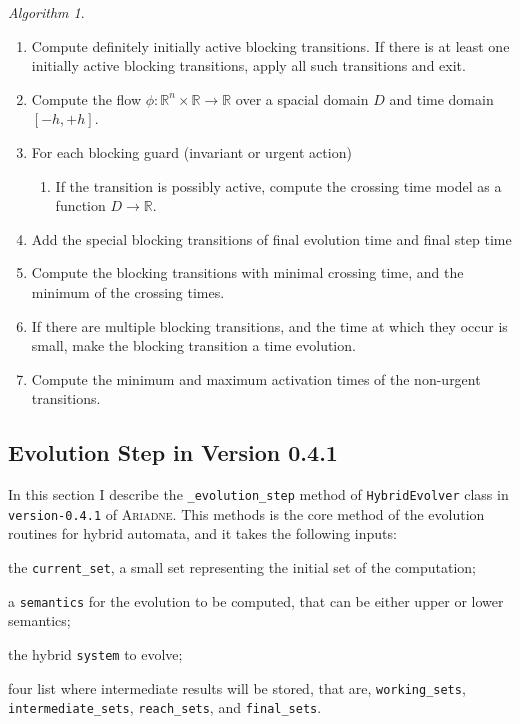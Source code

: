 \documentclass[english,a4paper]{article}
\newcommand{\R}{\mathbb{R}}
\newcommand{\ARIADNE}{\textsc{Ariadne}\xspace}
\theoremstyle{theorem}
\theoremstyle{definition}
\theoremstyle{remark}
\newtheorem*{algorithm*}{Algorithm}
\begin{document}
\begin{algorithm*}\mbox{}
 \begin{enumerate}
 \item Compute definitely initially active blocking transitions. If there is at least one initially active blocking transitions, apply all such transitions and exit.
 \item Compute the flow $\phi:\R^n\times\R\rightarrow\R$ over a spacial domain $D$ and time domain $[-h,+h]$.
 \item For each blocking guard (invariant or urgent action) 
  \begin{enumerate}
   \item If the transition is possibly active, compute the crossing time model as a function $D\rightarrow\R$.
  \end{enumerate}
 \item Add the special blocking transitions of final evolution time and final step time
 \item Compute the blocking transitions with minimal crossing time, and the minimum of the crossing times.
 \item If there are multiple blocking transitions, and the time at which they occur is small, make the blocking transition a time evolution.
 \item Compute the minimum and maximum activation times of the non-urgent transitions.

\end{enumerate}
\end{algorithm*}




\subsection*{Evolution Step in Version 0.4.1}

\noindent In this section I describe the \texttt{\_evolution\_step} method of \texttt{HybridEvolver} class in \texttt{version-0.4.1} of \ARIADNE. This methods is the core method of the evolution routines for hybrid automata, and it takes the following inputs:

\begin{compactitem}
	\item the \texttt{current\_set}, a small set representing the initial set of the computation;
	\item a \texttt{semantics} for the evolution to be computed, that can be either upper or lower semantics;
	\item the hybrid \texttt{system} to evolve;
	\item four list where intermediate results will be stored, that are, \texttt{working\_sets}, \texttt{intermediate\_sets}, \texttt{reach\_sets}, and \texttt{final\_sets}.
\end{compactitem}
\end{document}
